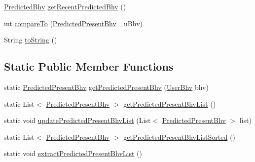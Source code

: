 \begin{DoxyCompactItemize}
\item 
\hyperlink{classlab_1_1davidahn_1_1appshuttle_1_1predict_1_1_predicted_bhv}{\-Predicted\-Bhv} \hyperlink{classlab_1_1davidahn_1_1appshuttle_1_1view_1_1_predicted_present_bhv_aec571bdb1694ce4953b37b01b2c9bf9d}{get\-Recent\-Predicted\-Bhv} ()
\item 
int \hyperlink{classlab_1_1davidahn_1_1appshuttle_1_1view_1_1_predicted_present_bhv_ac0d4ca772194369273ed2270428215f3}{compare\-To} (\hyperlink{classlab_1_1davidahn_1_1appshuttle_1_1view_1_1_predicted_present_bhv}{\-Predicted\-Present\-Bhv} \-\_\-u\-Bhv)
\item 
\-String \hyperlink{classlab_1_1davidahn_1_1appshuttle_1_1view_1_1_predicted_present_bhv_af018926a6780169c24baf3c907cd9ba3}{to\-String} ()
\end{DoxyCompactItemize}
\subsection*{\-Static \-Public \-Member \-Functions}
\begin{DoxyCompactItemize}
\item 
static \hyperlink{classlab_1_1davidahn_1_1appshuttle_1_1view_1_1_predicted_present_bhv}{\-Predicted\-Present\-Bhv} \hyperlink{classlab_1_1davidahn_1_1appshuttle_1_1view_1_1_predicted_present_bhv_a23f78d0886254f18512c8f5972d50452}{get\-Predicted\-Present\-Bhv} (\hyperlink{interfacelab_1_1davidahn_1_1appshuttle_1_1collect_1_1bhv_1_1_user_bhv}{\-User\-Bhv} bhv)
\item 
static \-List$<$ \hyperlink{classlab_1_1davidahn_1_1appshuttle_1_1view_1_1_predicted_present_bhv}{\-Predicted\-Present\-Bhv} $>$ \hyperlink{classlab_1_1davidahn_1_1appshuttle_1_1view_1_1_predicted_present_bhv_a7e858da91147540dc20c5cedd2cf085e}{get\-Predicted\-Present\-Bhv\-List} ()
\item 
static void \hyperlink{classlab_1_1davidahn_1_1appshuttle_1_1view_1_1_predicted_present_bhv_a25600e8969f112550c5c85a188aca552}{update\-Predicted\-Present\-Bhv\-List} (\-List$<$ \hyperlink{classlab_1_1davidahn_1_1appshuttle_1_1view_1_1_predicted_present_bhv}{\-Predicted\-Present\-Bhv} $>$ list)
\item 
static \-List$<$ \hyperlink{classlab_1_1davidahn_1_1appshuttle_1_1view_1_1_predicted_present_bhv}{\-Predicted\-Present\-Bhv} $>$ \hyperlink{classlab_1_1davidahn_1_1appshuttle_1_1view_1_1_predicted_present_bhv_a3376aad724accc7074d9ef4c7d850f61}{get\-Predicted\-Present\-Bhv\-List\-Sorted} ()
\item 
static void \hyperlink{classlab_1_1davidahn_1_1appshuttle_1_1view_1_1_predicted_present_bhv_aaa88af795e912df134fc9b75bc6d8bd0}{extract\-Predicted\-Present\-Bhv\-List} ()
\end{DoxyCompactItemize}
